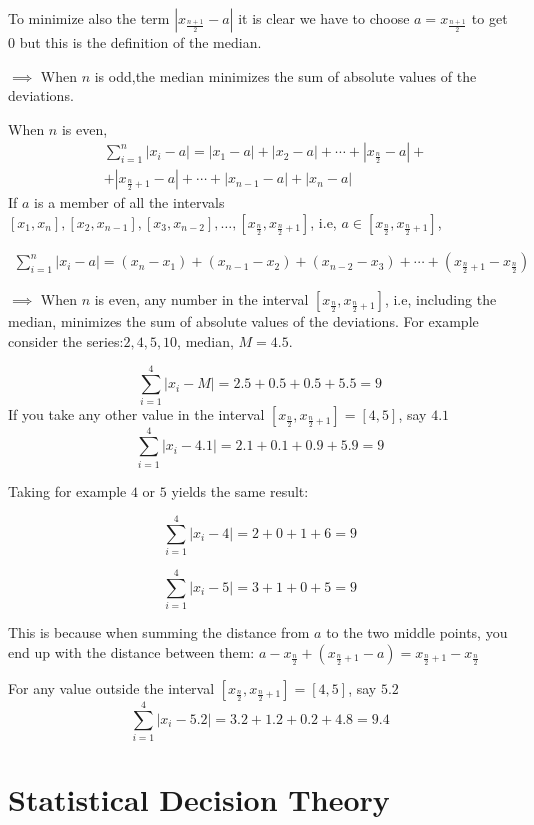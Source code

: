 \documentclass[12pt, letterpaper]{article}
\theoremstyle{definition}
\begin{document}
To minimize also the term $\left|x_{\tfrac{n+1}{2}}-a \right|$ it is clear we have to choose $a=x_{\tfrac{n+1}{2}}$ to get $0$ but this is the definition of the median.

$\implies$ When $n$ is odd,the median minimizes the sum of absolute values of the deviations.

When $n$ is even,
\begin{equation}
\begin{aligned}
&\sum_{i=1}^n|x_i-a|=|x_1-a|+|x_2-a|+\cdots+|x_{\tfrac{n}{2}}-a|+\\
&+|x_{\tfrac{n}{2}+1}-a|+ \cdots+|x_{n-1}-a|+|x_n-a|
\end{aligned}
\end{equation}
If $a$ is a member of all the intervals $[x_1,x_n], [x_2,x_{n-1}], [x_3,x_{n-2}], \ldots, \left[x_{\tfrac{n}{2}},x_{\tfrac{n}{2}+1}\right]$, i.e, $a\in\left[x_{\tfrac{n}{2}},x_{\tfrac{n}{2}+1}\right]$,

\begin{align}
\sum_{i=1}^n|x_i-a|=(x_n-x_1)+(x_{n-1}-x_2)+(x_{n-2}-x_3)+\cdots + \left(x_{\tfrac{n}{2}+1}-x_{\tfrac{n}{2}}\right)
\end{align}

$\implies$ When $n$ is even, any number in the interval $[x_{\tfrac{n}{2}},x_{\tfrac{n}{2}+1}]$, i.e, including the median, minimizes the sum of absolute values of the deviations. For example consider the series:$2, 4, 5, 10$, median, $M=4.5$.

$$
\sum_{i=1}^4|x_i-M|=2.5+0.5+0.5+5.5=9
$$
If you take any other value in the interval $\left[x_{\tfrac{n}{2}},x_{\tfrac{n}{2} + 1} \right] =[4,5]$, say $4.1$
$$
\sum_{i=1}^4|x_i-4.1|=2.1+0.1+0.9+5.9=9
$$

Taking for example $4$ or $5$ yields the same result:

$$
\sum_{i=1}^4|x_i-4|=2+0+1+6=9
$$

$$
\sum_{i=1}^4|x_i-5|=3+1+0+5=9
$$

This is because when summing the distance from $a$ to the two middle points, you end up with the distance between them: $a-x_{\tfrac{n}{2}}+(x_{\tfrac{n}{2}+1}-a) = x_{\tfrac{n}{2}+1}-x_{\tfrac{n}{2}}$

For any value outside the interval $\left[x_{\tfrac{n}{2}},x_{\tfrac{n}{2}+1}\right]=[4,5]$, say $5.2$
$$
\sum_{i=1}^4|x_i-5.2|=3.2+1.2+0.2+4.8=9.4
$$

\section{Statistical Decision Theory}
\end{document}
